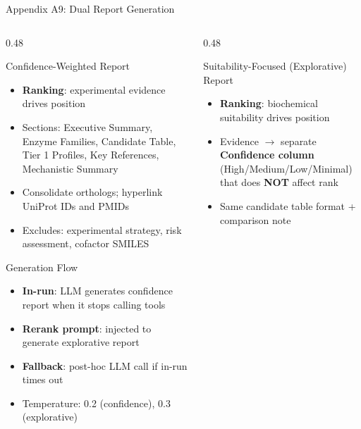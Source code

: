 \documentclass[aspectratio=169, 11pt]{beamer}
\begin{document}
\begin{frame}{Appendix A9: Dual Report Generation}
\vspace{-4pt}
\begin{columns}[T]
\begin{column}{0.48\textwidth}
\begin{block}{\small Confidence-Weighted Report}
\vspace{-2pt}
\begin{itemize}\scriptsize
\setlength\itemsep{1pt}
\item \textbf{Ranking}: experimental evidence drives position
\item Sections: Executive Summary, Enzyme Families, Candidate Table, Tier 1 Profiles, Key References, Mechanistic Summary
\item Consolidate orthologs; hyperlink UniProt IDs and PMIDs
\item Excludes: experimental strategy, risk assessment, cofactor SMILES
\end{itemize}
\end{block}

\begin{block}{\small Generation Flow}
\vspace{-2pt}
\begin{itemize}\scriptsize
\setlength\itemsep{0pt}
\item \textbf{In-run}: LLM generates confidence report when it stops calling tools
\item \textbf{Rerank prompt}: injected to generate explorative report
\item \textbf{Fallback}: post-hoc LLM call if in-run times out
\item Temperature: 0.2 (confidence), 0.3 (explorative)
\end{itemize}
\end{block}
\end{column}
\begin{column}{0.48\textwidth}
\begin{alertblock}{\small Suitability-Focused (Explorative) Report}
\vspace{-2pt}
\begin{itemize}\scriptsize
\setlength\itemsep{1pt}
\item \textbf{Ranking}: biochemical suitability drives position
\item Evidence $\rightarrow$ separate \textbf{Confidence column} (High/Medium/Low/Minimal) that does \textbf{NOT} affect rank
\item Same candidate table format + comparison note
\end{itemize}
\end{alertblock}


\end{column}
\end{columns}
\end{frame}
\end{document}
